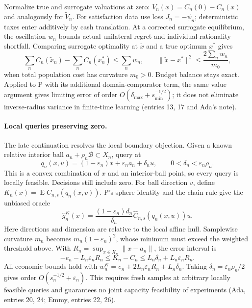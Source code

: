 \documentclass{article}
\begin{document}
Normalize true and surrogate valuations at zero:
\(V_n(x)=C_n(0)-C_n(x)\) and analogously for \(\widetilde V_n\).
For satisfaction data use loss \(J_n=-\psi_n\); deterministic taxes enter
additively by cash translation. At a corrected surrogate equilibrium, the
oscillation \(w_n\) bounds actual unilateral regret and individual-rationality
shortfall. Comparing surrogate optimality at \(\widetilde x\) and a true
optimum \(x^*\) gives
\[
 \sum_n C_n(\widetilde x_n)-\sum_n C_n(x_n^*)\le\sum_n w_n,
 \qquad
 \|\widetilde x-x^*\|^2\le\frac{2\sum_n w_n}{m_0},
\]
when total population cost has curvature \(m_0>0\). Budget balance stays
exact. Applied to P with its additional domain-comparator term, the same
value argument gives limiting error of order
\(O(\delta_{\max}+s_{\min}^{-1/2})\); it does not eliminate inverse-radius
variance in finite-time learning (entries 13, 17 and Ada's note).

\paragraph{Local queries preserving zero.}
The late continuation resolves the local boundary objection. Given a known
relative interior ball \(a_n+\rho_n\mathcal B\subset X_n\), query at
\[
 q_n(x,u)=(1-\varepsilon_n)x+\varepsilon_na_n+\delta_nu,
 \qquad 0<\delta_n<\varepsilon_n\rho_n.
\]
This is a convex combination of \(x\) and an interior-ball point, so every
query is locally feasible. Decisions still include zero. For ball direction
\(v\), define \(K_n(x)=\operatorname{E}\widehat C_{n,s}(q_n(x,v))\).
P's sphere identity and the chain rule give the unbiased oracle
\[
 \widehat g_n^K(x)=\frac{(1-\varepsilon_n)d_n}{\delta_n}
 \widehat C_{n,s}(q_n(x,u))u.
\]
Here directions and dimension are relative to the local affine hull.
Samplewise curvature \(m_n\) becomes \(m_n(1-\varepsilon_n)^2\), whose
minimum must exceed the weighted threshold above. With
\(R_n=\sup_{x\in X_n}\|x-a_n\|\), the error interval is
\[
 -e_n-L_n\varepsilon_nR_n\le K_n-C_n
 \le L_n\delta_n+L_n\varepsilon_nR_n.
\]
All economic bounds hold with
\(w_n^K=e_n+2L_n\varepsilon_nR_n+L_n\delta_n\). Taking
\(\delta_n=\varepsilon_n\rho_n/2\) gives order
\(O(s_n^{-1/2}+\varepsilon_n)\). This requires fresh samples at arbitrary
locally feasible queries and guarantees no joint capacity feasibility of
experiments (Ada, entries 20, 24; Emmy, entries 22, 26).
\end{document}
